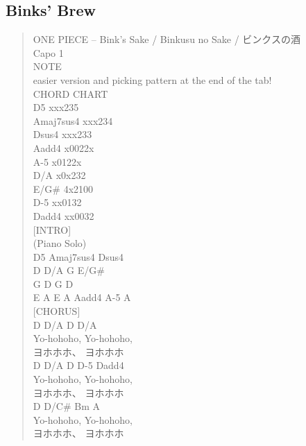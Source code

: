 \documentclass[11pt]{article}
\begin{document}
\subsection{Binks' Brew}
\label{sec:org6122bd5}
\begin{verse}
ONE PIECE – Bink’s Sake / Binkusu no Sake / ビンクスの酒\\
Capo 1\\
\vspace*{1em}
\vspace*{1em}
NOTE\\
easier version and picking pattern at the end of the tab!\\
\vspace*{1em}
\vspace*{1em}
CHORD CHART\\
D5        xxx235\\
Amaj7sus4 xxx234\\
Dsus4     xxx233\\
Aadd4     x0022x\\
A-5       x0122x\\
D/A       x0x232\\
E/G\#      4x2100\\
D-5       xx0132\\
Dadd4     xx0032\\
\vspace*{1em}
\vspace*{1em}
[INTRO]\\
(Piano Solo)\\
D5   Amaj7sus4   Dsus4\\
D  D/A  G  E/G\#\\
G       D       G       D\\
E       A       E       A   Aadd4   A-5   A\\
\vspace*{1em}
\vspace*{1em}
[CHORUS]\\
D       D/A     D      D/A\\
Yo-hohoho, Yo-hohoho,\\
ヨホホホ、    ヨホホホ\\
D       D/A     D      D-5   Dadd4\\
Yo-hohoho, Yo-hohoho,\\
ヨホホホ、    ヨホホホ\\
D       D/C\#    Bm     A\\
Yo-hohoho, Yo-hohoho,\\
ヨホホホ、    ヨホホホ\\

\end{verse}
\end{document}
